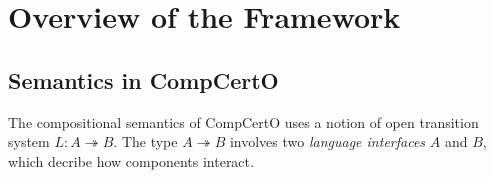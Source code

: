 \documentclass[acmsmall,screen,review,anonymous]{acmart}
\begin{document}
%
%
%
%
%
%
%
%


\section{Overview of the Framework} %

\subsection{Semantics in CompCertO} %


The compositional semantics of CompCertO uses %
a notion of open transition system $L : A \twoheadrightarrow B$.
The type $A \twoheadrightarrow B$ involves
two \emph{language interfaces} $A$ and $B$,
which decribe how components interact.
\end{document}
